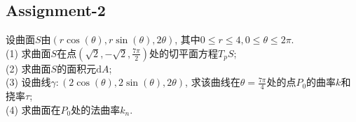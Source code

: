 \subsection{Assignment-2}

\begin{problem}
    设曲面$S$由$(r\cos (\theta),r \sin (\theta), 2 \theta)$, 其中$0 \le r \le 4,0 \le \theta \le 2 \pi$.\\
    (1) 求曲面$S$在点$\displaystyle (\sqrt{2},-\sqrt{2},\frac{7 \pi}{2})$处的切平面方程$T_pS$;\\
    (2) 求曲面$S$的面积元$\mathrm{d}A$;\\
    (3) 设曲线$\gamma:(2 \cos (\theta), 2 \sin (\theta), 2 \theta)$, 求该曲线在$\displaystyle \theta= \frac{7 \pi}{4}$处的点$P_0$的曲率$k$和挠率$\tau$;\\
    (4) 求曲面在$P_0$处的法曲率$k_n$.
\end{problem}

